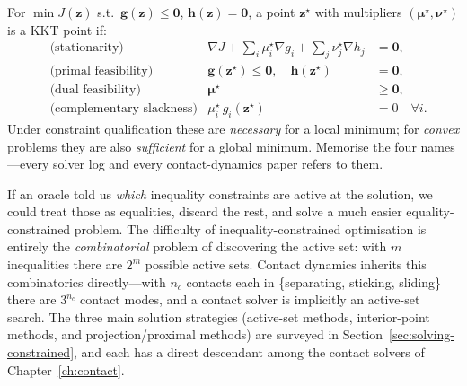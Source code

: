 \documentclass[11pt,twoside]{report}
\theoremstyle{definition}
\theoremstyle{plain}
\theoremstyle{remark}
\newcommand{\0}{\bm{0}}
\begin{document}
\begin{definitionbox}
For $\min J(\bm{z})$ s.t.\ $\bm{g}(\bm{z})\le\0$, $\bm{h}(\bm{z})=\0$,
a point $\bm{z}^{\star}$ with multipliers $(\bm{\mu}^{\star},\bm{\nu}^{\star})$
is a KKT point if:
\begin{align*}
&\text{(stationarity)} & \nabla J+\textstyle\sum_{i}\mu_{i}^{\star}\nabla g_{i}
+\sum_{j}\nu_{j}^{\star}\nabla h_{j}&=\0,\\
&\text{(primal feasibility)} & \bm{g}(\bm{z}^{\star})\le\0,\quad
\bm{h}(\bm{z}^{\star})&=\0,\\
&\text{(dual feasibility)} & \bm{\mu}^{\star}&\ge\0,\\
&\text{(complementary slackness)} & \mu_{i}^{\star}\,g_{i}(\bm{z}^{\star})&=0
\quad\forall i.
\end{align*}
Under constraint qualification these are \emph{necessary} for a local
minimum; for \emph{convex} problems they are also \emph{sufficient}
for a global minimum. Memorise the four names---every solver log and
every contact-dynamics paper refers to them.
\end{definitionbox}

\begin{insightbox}
If an oracle told us \emph{which} inequality constraints are active at
the solution, we could treat those as equalities, discard the rest,
and solve a much easier equality-constrained problem.
The difficulty of inequality-constrained optimisation is entirely the
\emph{combinatorial} problem of discovering the active set: with $m$
inequalities there are $2^{m}$ possible active sets.
Contact dynamics inherits this combinatorics directly---with $n_{c}$
contacts each in \{separating, sticking, sliding\} there are
$3^{n_{c}}$ contact modes, and a contact solver is implicitly an
active-set search. The three main solution strategies
(active-set methods, interior-point methods, and projection/proximal
methods) are surveyed in Section~\ref{sec:solving-constrained},
and each has a direct descendant among the contact solvers of
Chapter~\ref{ch:contact}.
\end{insightbox}
\end{document}
